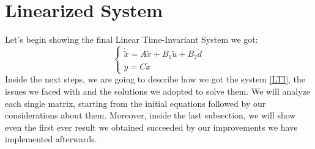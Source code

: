 \section{Linearized System} 
	Let's begin showing the final Linear Time-Invariant System we got:
		\begin{equation} \label{LTI}
			\begin{cases}
				\dot{\tilde{x}} = A \tilde{x} + B_{1}\tilde{u} + B_{2}\tilde{d}\\
				y = C\tilde{x} 
			\end{cases}
		\end{equation}
	Inside the next steps, we are going to describe how we got the system \ref{LTI}, the issues we faced with and the solutions we adopted to solve them. We will analyze each single matrix, starting from the initial equations followed by our considerations about them. Moreover, inside the last subsection, we will show even the first ever result we obtained succeeded by our improvements we have implemented afterwards.
